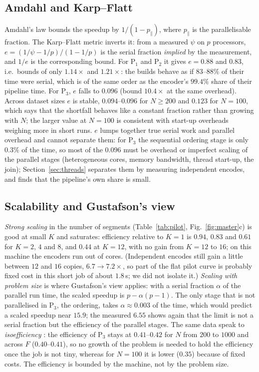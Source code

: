 \documentclass[conference]{IEEEtran}
\begin{document}
\subsection{Amdahl and Karp--Flatt}
Amdahl's law \cite{amdahl1967} bounds the speedup by $1/(1-p_\parallel)$, where $p_\parallel$ is the parallelisable fraction. The Karp--Flatt metric \cite{karpflatt1990} inverts it: from a measured $\psi$ on $p$ processors, $e=(1/\psi-1/p)/(1-1/p)$ is the serial fraction \emph{implied} by the measurement, and $1/e$ is the corresponding bound. For P$_1$ and P$_2$ it gives $e=0.88$ and $0.83$, i.e.\ bounds of only $1.14\times$ and $1.21\times$: the builds behave as if $83$--$88\%$ of their time were serial, which is of the same order as the encoder's $99.4\%$ share of their pipeline time. For P$_3$, $e$ falls to $0.096$ (bound $10.4\times$ at the same overhead). Across dataset sizes $e$ is stable, $0.094$--$0.096$ for $N\ge 200$ and $0.123$ for $N{=}100$, which says that the shortfall behaves like a constant fraction rather than growing with $N$; the larger value at $N{=}100$ is consistent with start-up overheads weighing more in short runs. $e$ lumps together true serial work and parallel overhead and cannot separate them: for P$_3$ the sequential ordering stage is only $0.3\%$ of the time, so most of the $0.096$ must be overhead or imperfect scaling of the parallel stages (heterogeneous cores, memory bandwidth, thread start-up, the join); Section~\ref{sec:threads} separates them by measuring independent encodes, and finds that the pipeline's own share is small.

\subsection{Scalability and Gustafson's view}
\emph{Strong scaling} in the number of segments (Table~\ref{tab:pilot}, Fig.~\ref{fig:master}c) is good at small $K$ and saturates: efficiency relative to $K{=}1$ is $0.94$, $0.83$ and $0.61$ for $K{=}2$, $4$ and $8$, and $0.44$ at $K{=}12$, with no gain from $K{=}12$ to $16$; on this machine the encoders run out of cores. (Independent encodes still gain a little between $12$ and $16$ copies, $6.7\to7.2\times$, so part of the flat pilot curve is probably fixed cost in this short job of about $1.8$\,s; we did not isolate it.) \emph{Scaling with problem size} is where Gustafson's view \cite{gustafson1988} applies: with a serial fraction $\alpha$ of the parallel run time, the scaled speedup is $p-\alpha(p-1)$. The only stage that is not parallelised in P$_3$, the ordering, takes $\alpha\approx0.003$ of the time, which would predict a scaled speedup near $15.9$; the measured $6.55$ shows again that the limit is not a serial fraction but the efficiency of the parallel stages. The same data speak to \emph{isoefficiency} \cite{grama2003}: the efficiency of P$_3$ stays at $0.41$--$0.42$ for $N$ from $200$ to $1000$ and across $F$ ($0.40$--$0.41$), so no growth of the problem is needed to hold the efficiency once the job is not tiny, whereas for $N{=}100$ it is lower ($0.35$) because of fixed costs. The efficiency is bounded by the machine, not by the problem size.
\end{document}
